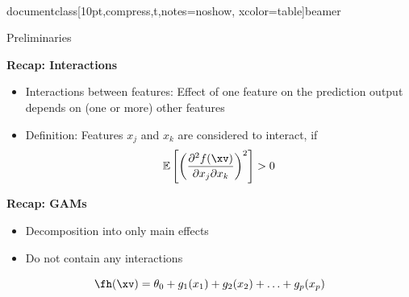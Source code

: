 \\documentclass[10pt,compress,t,notes=noshow, xcolor=table]{beamer}
\begin{document}
\begin{frame}{Preliminaries}

    \textbf{Recap: Interactions}
    \begin{itemize}
        \item Interactions between features: Effect of one feature on the prediction output depends on (one or more) other features
        \item Definition: Features $x_j$  and $x_k$ are considered to interact, if
        $$
        \mathbb{E} \left[ \left( \frac{\partial^2 f(\xv)}{\partial x_j \partial x_k} \right)^2 \right] > 0
        $$
    \end{itemize}
    
    \pause
    \textbf{Recap: GAMs}
    \begin{itemize}
        \item Decomposition into only main effects
        \item Do not contain any interactions
    \end{itemize}
    $$
    \fh (\xv) = \theta_0 + g_1(x_1) + g_2(x_2) + \ldots + g_p(x_p)
    $$



\end{frame}
\end{document}
